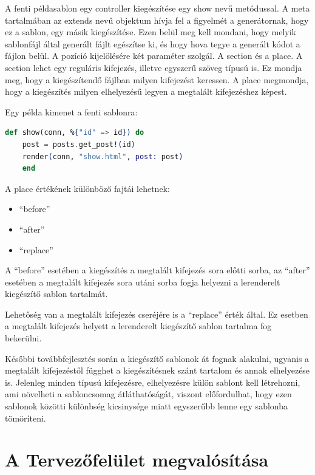 \documentclass[a4paper,12pt,oneside]{report}
\begin{document}
\begin{justify}
	A fenti példasablon egy controller kiegészítése egy show nevű metódussal. A meta tartalmában az extends nevű objektum hívja fel a figyelmét a generátornak, hogy ez a sablon, egy másik kiegészítése. Ezen belül meg kell mondani, hogy melyik sablonfájl által generált fájlt egészítse ki, és hogy hova tegye a generált kódot a fájlon belül. A pozíció kijelölésére két paraméter szolgál. A section és a place. A section lehet egy reguláris kifejezés, illetve egyszerű szöveg típusú is. Ez mondja meg, hogy a kiegészítendő fájlban milyen kifejezést keressen. A place megmondja, hogy a kiegészítés milyen elhelyezésű legyen a megtalált kifejezéshez képest.

	Egy példa kimenet a fenti sablonra: 

	\begin{lstlisting}[language=elixir]
	def show(conn, %{"id" => id}) do
	post = posts.get_post!(id)
	render(conn, "show.html", post: post)
	end
	\end{lstlisting}

	A place értékének különböző fajtái lehetnek: 

	\begin{itemize}
		\item “before”
		\item “after”
		\item “replace”
	\end{itemize}

	A “before” esetében a kiegészítés a megtalált kifejezés sora előtti sorba, az “after” esetében a megtalált kifejezés sora utáni sorba fogja helyezni a lerenderelt kiegészítő sablon tartalmát.

	Lehetőség van a megtalált kifejezés cseréjére is a “replace” érték által. Ez esetben a megtalált kifejezés helyett a lerenderelt kiegészítő sablon tartalma fog bekerülni.

	Későbbi továbbfejlesztés során a kiegészítő sablonok át fognak alakulni, ugyanis a megtalált kifejezéstől függhet a kiegészítésnek szánt tartalom és annak elhelyezése is. Jelenleg minden típusú kifejezésre, elhelyezésre külön sablont kell létrehozni, ami növelheti a sabloncsomag átláthatóságát, viszont előfordulhat, hogy ezen sablonok közötti különbség kicsinysége miatt egyszerűbb lenne egy sablonba tömöríteni.

\end{justify}

\newpage
\section{A Tervezőfelület megvalósítása}
\end{document}

